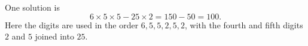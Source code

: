 One solution is
\[
6\times5\times5-25\times2=150-50=\boxed{100}.
\]
Here the digits are used in the order $6,5,5,2,5,2$, with the fourth and fifth digits $2$ and $5$ joined into $25$.
